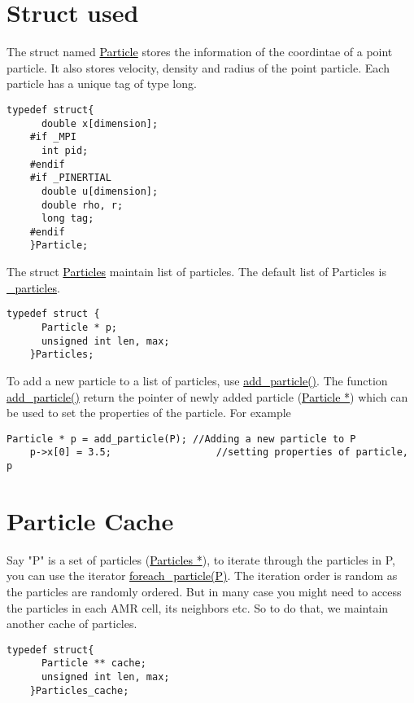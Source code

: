 \documentclass[a4paper,12pt]{article}
\newcommand{\fname}[1]{\textcolor{black}{\underline{#1}}}
\begin{document}
    \section{Struct used}
    
    The struct named \fname{Particle} stores the information of the coordintae of a point particle. It also stores velocity, density and radius of the point particle. Each particle has a unique tag of type long.
    \begin{lstlisting}[style=CStyle]
    typedef struct{
      double x[dimension];
    #if _MPI
      int pid;
    #endif
    #if _PINERTIAL
      double u[dimension];
      double rho, r;
      long tag;
    #endif
    }Particle;
    \end{lstlisting}
    
    The struct \fname{Particles} maintain list of particles. The default list of Particles is \fname{\_particles}.
    
    \begin{lstlisting}[style=CStyle]
    typedef struct {
      Particle * p;
      unsigned int len, max;
    }Particles;
    \end{lstlisting}
    
    
    
    To add a new particle to a list of particles, use \fname{add\_particle()}. The function \fname{add\_particle()} return the pointer of newly added particle (\fname{Particle *}) which can be used to set the properties of the particle. For example
    \begin{lstlisting}[style=CStyle]
    Particle * p = add_particle(P); //Adding a new particle to P
    p->x[0] = 3.5;                  //setting properties of particle, p
    \end{lstlisting}
    
    \section{Particle Cache}
    Say "P" is a set of particles (\fname{Particles *}), to iterate through the particles in P, you can use the iterator \fname{foreach\_particle(P)}. The iteration order is random as the particles are randomly ordered. But in many case you might need to access the particles in each AMR cell, its neighbors etc. So to do that, we maintain another cache of particles.
    
    \begin{lstlisting}[style=CStyle]
    typedef struct{
      Particle ** cache;
      unsigned int len, max;
    }Particles_cache;
    \end{lstlisting}
    
\end{document}
